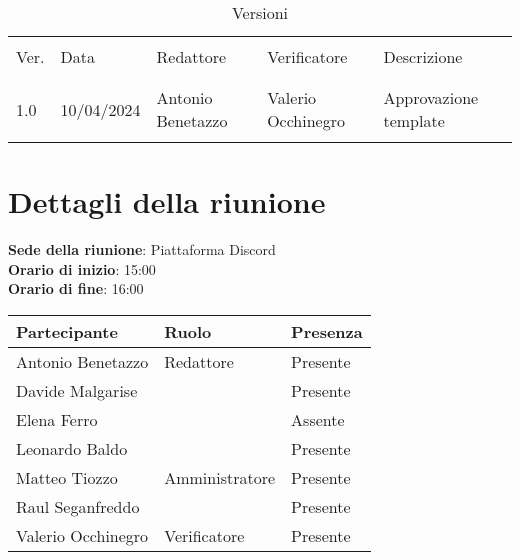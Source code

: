 \documentclass[italian,12pt]{article}
\begin{document}


\newpage



\begin{table}[!h]
	\caption{Versioni}
	\footnotesize
	\begin{center}
		\begin{tabular}{ l l l l l }
			\hline                                                                              \\[-2ex]
			Ver. & Data       & Redattore          & Verificatore       & Descrizione           \\
			\\[-2ex] \hline \\[-1.5ex]
			1.0  & 10/04/2024 & Antonio Benetazzo    & Valerio Occhinegro & Approvazione template \\
			\\[-1.5ex] \hline
		\end{tabular}
	\end{center}
\end{table}

\newpage

\tableofcontents

\newpage

\section{Dettagli della riunione}


\textbf{Sede della riunione}: Piattaforma Discord\\
\textbf{Orario di inizio}: 15:00\\
\textbf{Orario di fine}: 16:00\\


\begin{flushleft}
	\begin{table}[!h]
	\begin{tabular}{ |l|l|l| } 
		\hline
		\textbf{Partecipante} & \textbf{Ruolo}       & \textbf{Presenza} \\
		\hline 
		Antonio Benetazzo     & Redattore            & Presente          \\
		Davide Malgarise      &                      & Presente          \\
		Elena Ferro           &                      & Assente           \\
		Leonardo Baldo        &                      & Presente          \\
		Matteo Tiozzo         & Amministratore       & Presente          \\
		Raul Seganfreddo      &                      & Presente          \\
		Valerio Occhinegro    & Verificatore         & Presente          \\
		\hline
	\end{tabular}
	\end{table}
\end{flushleft}
\end{document}
